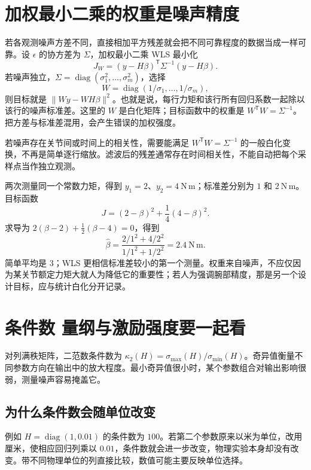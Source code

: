 \section{加权最小二乘的权重是噪声精度}
若各观测噪声方差不同，直接相加平方残差就会把不同可靠程度的数据当成一样可靠。设 $\epsilon$ 的协方差为 $\Sigma$，加权最小二乘 WLS 最小化
\begin{equation}
 J_W=(y-H\beta)^{\mathsf T}\Sigma^{-1}(y-H\beta).
\end{equation}
若噪声独立，$\Sigma=\operatorname{diag}(\sigma_1^2,\ldots,\sigma_m^2)$，选择
\[
 W=\operatorname{diag}(1/\sigma_1,\ldots,1/\sigma_m),
\]
则目标就是 $\|Wy-WH\beta\|^2$。也就是说，每行力矩和该行所有回归系数一起除以该行的噪声标准差。这里的 $W$ 是白化矩阵；目标函数中的权重是 $W^{\mathsf T}W=\Sigma^{-1}$。把方差与标准差混用，会产生错误的加权强度。

若噪声存在关节间或时间上的相关性，需要能满足 $W^{\mathsf T}W=\Sigma^{-1}$ 的一般白化变换，不再是简单逐行缩放。滤波后的残差通常存在时间相关性，不能自动把每个采样点当作独立观测。

\begin{examplebox}[算例 8B 两个测量值的最优加权平均]
两次测量同一个常数力矩，得到 $y_1=2$、$y_2=4\ \mathrm{N\,m}$；标准差分别为 $1$ 和 $2\ \mathrm{N\,m}$。目标函数
\[
 J=(2-\beta)^2+\frac14(4-\beta)^2.
\]
求导为 $2(\beta-2)+\tfrac12(\beta-4)=0$，得到
\[
 \hat\beta=\frac{2/1^2+4/2^2}{1/1^2+1/2^2}=2.4\ \mathrm{N\,m}.
\]
简单平均是 $3$；WLS 更相信标准差较小的第一个测量。权重来自噪声，不应仅因为某关节额定力矩大就人为降低它的重要性；若人为强调腕部精度，那是另一个设计目标，应与统计白化分开记录。
\end{examplebox}

\section{条件数 量纲与激励强度要一起看}
对列满秩矩阵，二范数条件数为 $\kappa_2(H)=\sigma_{\max}(H)/\sigma_{\min}(H)$。奇异值衡量不同参数方向在输出中的放大程度。最小奇异值很小时，某个参数组合对输出影响很弱，测量噪声容易掩盖它。

\subsection{为什么条件数会随单位改变}
例如 $H=\operatorname{diag}(1,0.01)$ 的条件数为 $100$。若第二个参数原来以米为单位，改用厘米，使相应回归列乘以 $0.01$，条件数就会进一步改变，物理实验本身却没有改变。带不同物理单位的列直接比较，数值可能主要反映单位选择。

